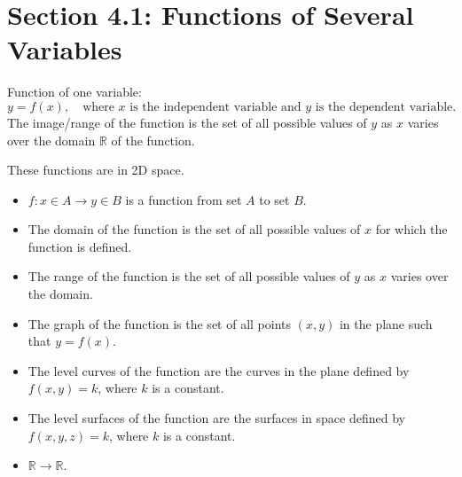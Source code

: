 \documentclass{article}
\begin{document}
\section*{Section 4.1: Functions of Several Variables}
\begin{conceptbox}
Function of one variable:
\[
    y = f(x), \quad \text{where } x \text{ is the independent variable and } y \text{ is the dependent variable}.
\]
The image/range of the function is the set of all possible values of \( y \) as \( x \) varies over the domain \( \mathbb{R} \) of the function.
\begin{notebox}
These functions are in 2D space.
\begin{itemize}
    \item \( f: x \in A \to y \in B \) is a function from set \( A \) to set \( B \).
    \item The domain of the function is the set of all possible values of \( x \) for which the function is defined.
    \item The range of the function is the set of all possible values of \( y \) as \( x \) varies over the domain.
    \item The graph of the function is the set of all points \( (x, y) \) in the plane such that \( y = f(x) \).
    \item The level curves of the function are the curves in the plane defined by \( f(x, y) = k \), where \( k \) is a constant.
    \item The level surfaces of the function are the surfaces in space defined by \( f(x, y, z) = k \), where \( k \) is a constant.
    \item \( \mathbb{R} \to \mathbb{R} \).
\end{itemize} 
\end{notebox}
\end{conceptbox}
\end{document}
